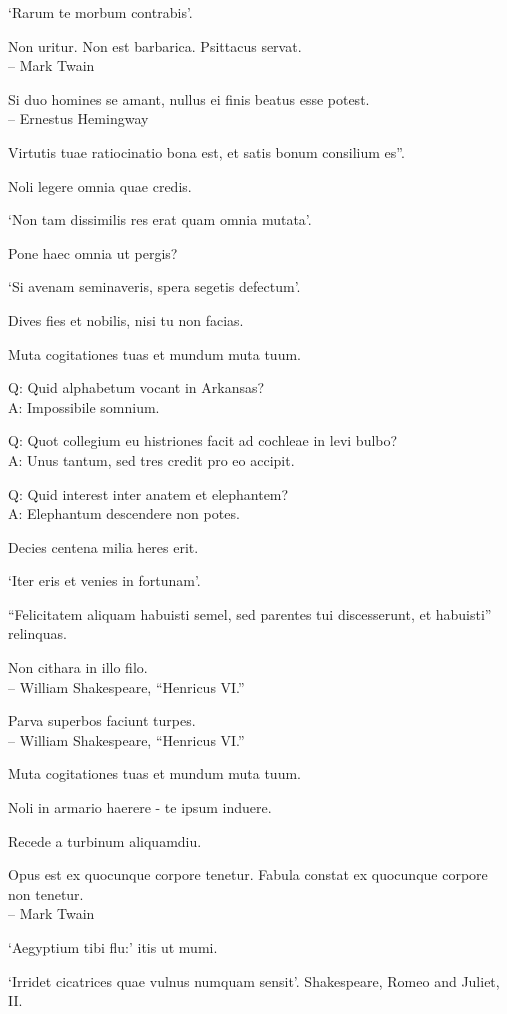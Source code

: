\documentclass[titlepage,12pt]{memoir}
\begin{document}
‘Rarum te morbum contrabis’.

Non uritur. Non est barbarica. Psittacus servat.
\\-- Mark Twain

Si duo homines se amant, nullus ei finis beatus esse potest.
\\-- Ernestus Hemingway

Virtutis tuae ratiocinatio bona est, et satis bonum consilium es”.

Noli legere omnia quae credis.

‘Non tam dissimilis res erat quam omnia mutata’.

Pone haec omnia ut pergis?

‘Si avenam seminaveris, spera segetis defectum’.

 Dives fies et nobilis, nisi tu non facias.

Muta cogitationes tuas et mundum muta tuum.

Q: Quid alphabetum vocant in Arkansas?\\
A: Impossibile somnium.

Q: Quot collegium eu histriones facit ad cochleae in levi bulbo?\\
A: Unus tantum, sed tres credit pro eo accipit.

Q: Quid interest inter anatem et elephantem?\\
A: Elephantum descendere non potes.

Decies centena milia heres erit.

‘Iter eris et venies in fortunam’.

“Felicitatem aliquam habuisti semel, sed parentes tui discesserunt, et habuisti”
relinquas.

Non cithara in illo filo.
\\-- William Shakespeare, “Henricus VI.”

Parva superbos faciunt turpes.
\\-- William Shakespeare, “Henricus VI.”

Muta cogitationes tuas et mundum muta tuum.

Noli in armario haerere - te ipsum induere.

Recede a turbinum aliquamdiu.

Opus est ex quocunque corpore tenetur.
Fabula constat ex quocunque corpore non tenetur.
\\-- Mark Twain

‘Aegyptium tibi flu:’ itis ut mumi.

‘Irridet cicatrices quae vulnus numquam sensit’.
Shakespeare, Romeo and Juliet, II.
\end{document}
